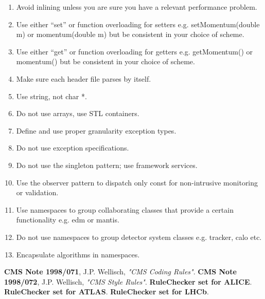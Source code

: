 \documentclass{cmspaper}
\begin{document}
\begin{enumerate}

\item Avoid inlining unless you are sure you have a relevant performance problem.
\item Use either ``set'' or function overloading for setters e.g. setMomentum(double m) 
      or momentum(double m) but be consistent in your choice of scheme.
\item Use either ``get'' or function overloading for getters e.g. getMomentum() or momentum()
      but be consistent in your choice of scheme.
\item Make sure each header file parses by itself.
\item Use string, not char *.
\item Do not use arrays, use STL containers.
\item Define and use proper granularity exception types. 
\item Do not use exception specifications.
\item Do not use the singleton pattern; use framework services.
\item Use the observer pattern to dispatch only const for
  non-intrusive monitoring or validation.
\item Use namespaces to group collaborating classes that provide a
  certain functionality e.g. edm or mantis. 
\item Do not use namespaces to group detector system classes
  e.g. tracker, calo etc.
\item Encapsulate algorithms in namespaces.

\end{enumerate}

\begin{thebibliography}{5}
   {\bf CMS Note 1998/071},
    J.P. Wellisch,
    {\em "CMS Coding Rules"}.
   {\bf CMS Note 1998/072},
    J.P. Wellisch,
    {\em "CMS Style Rules"}.
   {\bf RuleChecker set for ALICE}.
   {\bf RuleChecker set for ATLAS}.
   {\bf RuleChecker set for LHCb}.

\end{thebibliography}
 
\end{document}

